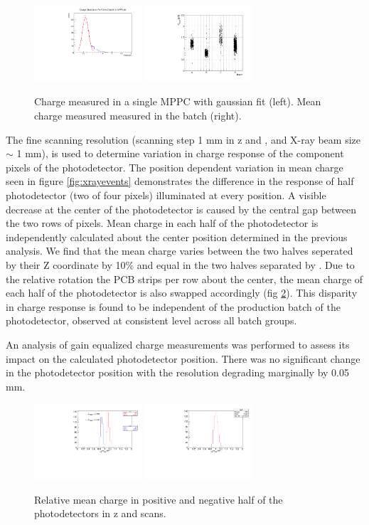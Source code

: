 \begin{figure}
\includegraphics[width=4cm]{plots/2018/qgaindist64.pdf}
\includegraphics[width=4cm]{plots/2018/qmean_vs_batch.pdf}
\caption{Charge measured in a single MPPC with gaussian fit (left).
Mean charge measured measured in the batch (right). }
\label{fig:mppccharge} 
\end{figure}

The fine scanning resolution (scanning step 1 mm in z and \phis, and
X-ray beam size  $\sim$ 1 mm), is used to determine variation in
charge response of the component pixels of the photodetector.  The
position dependent variation in mean charge seen in figure
\ref{fig:xrayevents} demonstrates the difference in the response of
half photodetector  (two of four pixels) illuminated at every
position.  A visible decrease at the center of the photodetector is
caused by the central gap between the two rows of pixels.  Mean charge
in each half of the photodetector is independently calculated about
the center position determined in the previous analysis.  We find that
the mean charge varies between the two halves seperated by their Z
coordinate by 10\% and equal in the two halves separated by \phis.  Due
to the relative rotation the PCB strips per row about the center, the
mean charge of each half of the photodetector is also swapped
accordingly (fig \ref{fig:pixelcharge}). 
This disparity in charge response
is found to be independent of the production batch of the 
photodetector, observed at consistent level across all
batch groups.

An analysis of gain equalized charge measurements
was performed to assess its impact on the calculated 
photodetector position. There was no significant change
in the photodetector position with the resolution
degrading marginally by 0.05 mm. 

\begin{figure}
\includegraphics[width=4cm]{plots/2018/h1_z.pdf}
\includegraphics[width=4cm]{plots/2018/h1_phi.pdf}
\caption{Relative mean charge in positive and negative half of the 
photodetectors in z and \phis scans.}
\label{fig:pixelcharge} 
\end{figure}



